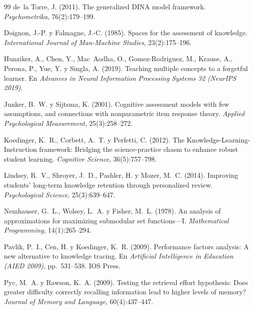 \documentclass[11pt]{article}
\theoremstyle{definition}
\theoremstyle{remark}
\begin{document}
\begin{thebibliography}{99}
de~la Torre, J. (2011).
\newblock The generalized DINA model framework.
\newblock \emph{Psychometrika}, 76(2):179--199.

Doignon, J.-P. y Falmagne, J.-C. (1985).
\newblock Spaces for the assessment of knowledge.
\newblock \emph{International Journal of Man-Machine Studies}, 23(2):175--196.

Hunziker, A., Chen, Y., Mac~Aodha, O., Gomez-Rodriguez, M., Krause, A., Perona, P., Yue, Y. y Singla, A. (2019).
\newblock Teaching multiple concepts to a forgetful learner.
\newblock En \emph{Advances in Neural Information Processing Systems 32 (NeurIPS 2019)}.

Junker, B.~W. y Sijtsma, K. (2001).
\newblock Cognitive assessment models with few assumptions, and connections with nonparametric item response theory.
\newblock \emph{Applied Psychological Measurement}, 25(3):258--272.

Koedinger, K.~R., Corbett, A.~T. y Perfetti, C. (2012).
\newblock The Knowledge-Learning-Instruction framework: Bridging the science-practice chasm to enhance robust student learning.
\newblock \emph{Cognitive Science}, 36(5):757--798.

Lindsey, R.~V., Shroyer, J.~D., Pashler, H. y Mozer, M.~C. (2014).
\newblock Improving students' long-term knowledge retention through personalized review.
\newblock \emph{Psychological Science}, 25(3):639--647.

Nemhauser, G.~L., Wolsey, L.~A. y Fisher, M.~L. (1978).
\newblock An analysis of approximations for maximizing submodular set functions---I.
\newblock \emph{Mathematical Programming}, 14(1):265--294.

Pavlik, P.~I., Cen, H. y Koedinger, K.~R. (2009).
\newblock Performance factors analysis: A new alternative to knowledge tracing.
\newblock En \emph{Artificial Intelligence in Education (AIED 2009)}, pp.~531--538. IOS Press.

Pyc, M.~A. y Rawson, K.~A. (2009).
\newblock Testing the retrieval effort hypothesis: Does greater difficulty correctly recalling information lead to higher levels of memory?
\newblock \emph{Journal of Memory and Language}, 60(4):437--447.


\end{thebibliography}
\end{document}
